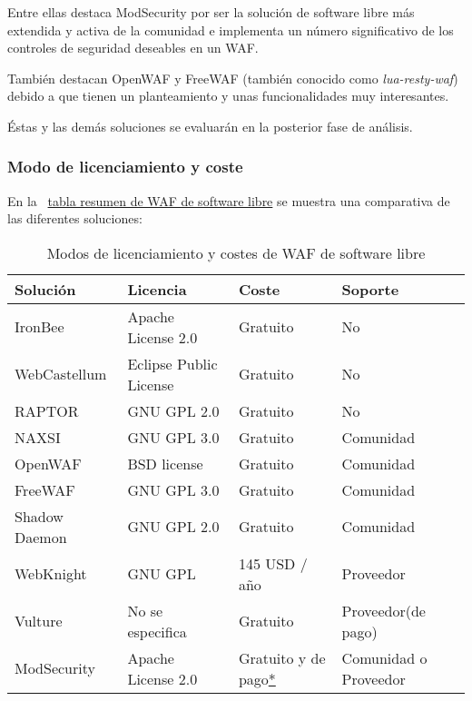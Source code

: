 \par Entre ellas destaca ModSecurity por ser la solución de software libre más extendida y activa de la comunidad e implementa un número
significativo de los controles de seguridad deseables en un WAF.
\par También destacan OpenWAF y FreeWAF (también conocido como {\em lua-resty-waf}) debido a que tienen un planteamiento y unas
funcionalidades muy interesantes.
\par Éstas y las demás soluciones se evaluarán en la posterior fase de análisis.


\subsubsection{Modo de licenciamiento y coste}
En la {~\hyperref[tab:waflibre]{tabla resumen de WAF de software libre}} se muestra una comparativa de las diferentes soluciones:

\begin{table}[h!]
  \centering
  \label{tab:waflibre}
  \begin{tabular}{llll}
    \hline
     Solución             & Licencia                        & Coste                           & Soporte                         \\
    \hline
     IronBee              & Apache License 2.0              & Gratuito                        & No                              \\
     WebCastellum					& Eclipse Public License          & Gratuito                        & No                              \\
     RAPTOR					      & GNU GPL 2.0                     & Gratuito                        & No                              \\
     NAXSI					      & GNU GPL 3.0                     & Gratuito                        & Comunidad                       \\
     OpenWAF					    & BSD license                     & Gratuito                        & Comunidad                       \\
     FreeWAF					    & GNU GPL 3.0                     & Gratuito                        & Comunidad                       \\
     Shadow Daemon				& GNU GPL 2.0                     & Gratuito                        & Comunidad                       \\
     WebKnight		        & GNU GPL                         & 145 USD / año                   & Proveedor                       \\
     Vulture					    & No se especifica                & Gratuito                        & Proveedor(de pago)              \\
     ModSecurity 					& Apache License 2.0              & Gratuito y de pago\hyperlink{modlic}{*}  & Comunidad o Proveedor  \\
    \hline
  \end{tabular}
  \caption{Modos de licenciamiento y costes de WAF de software libre}
\end{table}

